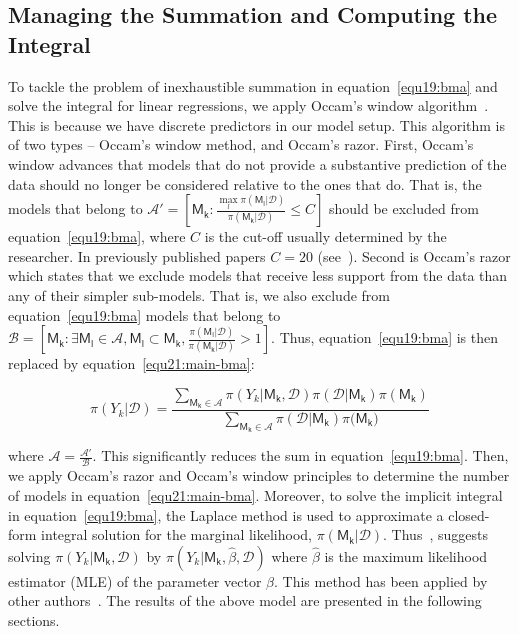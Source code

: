 \documentclass[a4paper, 12pt]{article}
\begin{document}
    \subsection{Managing the Summation and Computing the Integral}\label{subsec5.1:managing-the-summation-and-computing-the-integral}
    To tackle the problem of inexhaustible summation in equation~\ref{equ19:bma} and solve the integral for linear regressions, we apply Occam’s window algorithm~\parencites{madigan1995, madiganraftery1994, rafteryetal1993}. This is because we have discrete predictors in our model setup. This algorithm is of two types – Occam’s window method, and Occam’s razor. First, Occam’s window advances that models that do not provide a substantive prediction of the data should no longer be considered relative to the ones that do. That is, the models that belong to $\mathscr{A'} = \left[{\mathsf{M_k:} \frac{\max \limits_{l}{\pi(\mathsf{M_l} | \mathcal{D})}}{\pi(\mathsf{M_k} |\mathcal{D})} \leqslant C}\right]$ should be excluded from equation~\ref{equ19:bma}, where $C$ is the cut-off usually determined by the researcher. In previously published papers $C = 20$ (see~\parencite{madigan1995, draper1995, raftery1993, rafteryetal1993}). Second is Occam’s razor which states that we exclude models that receive less support from the data than any of their simpler sub-models. That is, we also exclude from equation~\ref{equ19:bma} models that belong to $\mathscr{B} = \left[\mathsf{M_k:} \exists \mathsf{M_l} \in \mathscr{A}, \mathsf{M_l} \subset \mathsf{M_k}, \frac{\pi(\mathsf{M_l} | \mathcal{D})}{\pi(\mathsf{M_k} | \mathcal{D})} > 1 \right]$. Thus, equation~\ref{equ19:bma} is then replaced by equation~\ref{equ21:main-bma}:

    \begin{equation}
        \label{equ21:main-bma}
        \pi(Y_k | \mathcal{D}) = \frac{\sum_{\mathsf{M_k} \in \mathscr{A}} \pi(Y_k | \mathsf{M_k}, \mathcal{D}) \pi(\mathcal{D} | \mathsf{M_k}) \pi(\mathsf{M_k})}{\sum_{\mathsf{M_k} \in \mathscr{A}} \pi(\mathcal{D} | \mathsf{M_k}) \pi(\mathsf{M_k)}}
    \end{equation}

    where $\mathscr{A} = \frac{\mathscr{A'}}{\mathscr{B}}$. This significantly reduces the sum in equation~\ref{equ19:bma}. Then, we apply Occam’s razor and Occam’s window principles to determine the number of models in equation~\ref{equ21:main-bma}. Moreover, to solve the implicit integral in equation~\ref{equ19:bma}, the Laplace method is used to approximate a closed-form integral solution for the marginal likelihood, $\pi(\mathsf{M_k} | \mathcal{D})$. Thus~\cite{taplin1993}, suggests solving $\pi(Y_k | \mathsf{M_k}, \mathcal{D})$ by $\pi(Y_k | \mathsf{M_k}, \hat{\beta}, \mathcal{D})$ where $\hat{\beta}$ is the maximum likelihood estimator (MLE) of the parameter vector $\beta$. This method has been applied by other authors~\parencites{volinsky1997, rafteryetal1996, draper1995}. The results of the above model are presented in the following sections.
\end{document}
